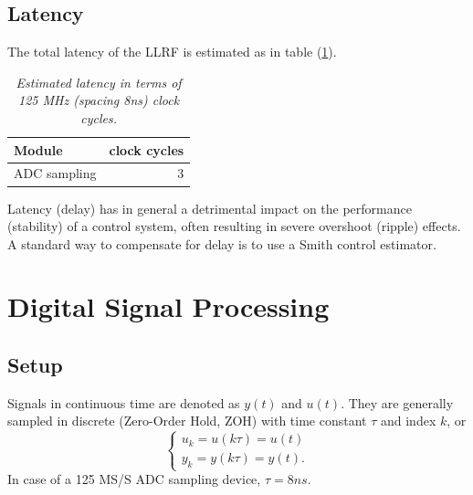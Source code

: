 \documentclass[12pt]{amsart}
\begin{document}
\subsection{Latency}

The total latency of the LLRF is estimated as in table (\ref{tab:delay}).


\begin{table}
  \begin{center}
    \caption{\em Estimated latency in terms of 125 MHz (spacing 8ns) clock cycles.}
    \label{tab:delay}
    \begin{tabular}{|l || r |} %
      \hline
      \textbf{Module} & \textbf{clock cycles} \\ 
      \hline
          ADC sampling	& 3 \\
       \hline
    \end{tabular}
  \end{center}
\end{table}

Latency (delay) has in general a detrimental impact on the performance (stability) of a control system,
often resulting in severe overshoot (ripple) effects.
A standard way to compensate for delay is to use a Smith control estimator.









\newpage
{}
\section{Digital Signal Processing}

\subsection{Setup}

Signals in continuous time are denoted as $y(t)$ and $u(t)$.
They are generally sampled in discrete (Zero-Order Hold, ZOH) with time constant $\tau$
and index $k$, or
\begin{equation}
	\begin{cases}
		u_k = u(k\tau) = u(t) \\
		y_k = y(k\tau) = y(t).
	\end{cases}
	\label{eq.c2d}
\end{equation}
In case of a 125 MS/S ADC sampling device, $\tau=8ns$.
\end{document}
